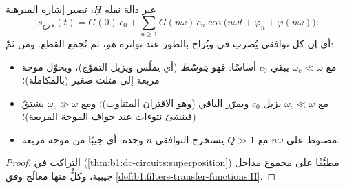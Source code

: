 \begin{proposition}\label{prop:b1:filters-transfer-functions:filtering}
عبر  دالة نقله $\underline H$، تصير إشارة
المبرهنة
\[
s_{\text{خرج}}(t) = G(0)\,c_0 + \sum_{n \geq 1} G(n\omega)\,c_n\cos\!\big(n\omega t + \varphi_n + \varphi(n\omega)\big):
\]
أي إن كل توافقي يُضرب في  ويُزاح بالطور عند
تواتره \emph{هو}، ثم تُجمع القطع. ومن ثمّ:
\begin{itemize}
  \item {} مع $\omega_c \ll \omega$ يبقي $c_0$ أساسًا:
        فهو \emph{يتوسّط} (أي يملّس ويزيل التموّج)، ويحوّل
        موجة مربعة إلى مثلث صغير (بالمكاملة)؛
  \item {} مع $\omega_c \ll \omega$ يزيل $c_0$ ويمرّر
        الباقي (وهو الاقتران المتناوب)؛ ومع $\omega_c \gg \omega$
        يشتقّ (فينشئ نتوءات عند حواف الموجة المربعة)؛
  \item {} مضبوط على $n\omega$ مع $Q \gg 1$ يستخرج
        التوافقي $n$ وحده: أي جيبًا من موجة مربعة.
\end{itemize}
\end{proposition}

\begin{proof}
التراكب في  (\cref{thm:b1:dc-circuits:superposition})
مطبَّقًا على مجموع مداخل جيبية، وكلٌّ منها معالَج وفق
\cref{def:b1:filters-transfer-functions:H}.
\end{proof}

